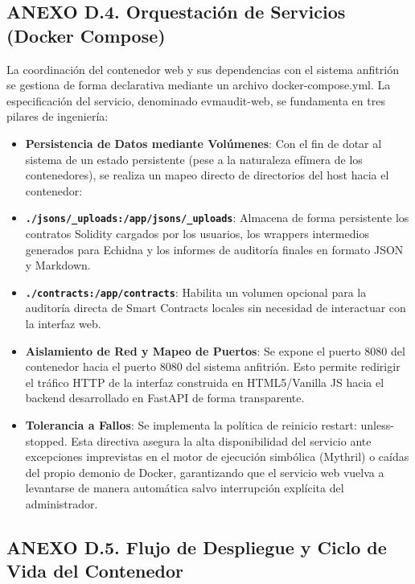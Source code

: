 \subsection{ANEXO D.4. Orquestación de Servicios (Docker
Compose)}\label{anexo-d.4.-orquestaciuxf3n-de-servicios-docker-compose}

La coordinación del contenedor web y sus dependencias con el sistema
anfitrión se gestiona de forma declarativa mediante un archivo
docker-compose.yml. La especificación del servicio, denominado
evmaudit-web, se fundamenta en tres pilares de ingeniería:

\begin{itemize}
\tightlist
\item
  \textbf{Persistencia de Datos mediante Volúmenes}: Con el fin de dotar
  al sistema de un estado persistente (pese a la naturaleza efímera de
  los contenedores), se realiza un mapeo directo de directorios del host
  hacia el contenedor:
\item
  \textbf{\texttt{./jsons/\_uploads:/app/jsons/\_uploads}}: Almacena de
  forma persistente los contratos Solidity cargados por los usuarios,
  los wrappers intermedios generados para Echidna y los informes de
  auditoría finales en formato JSON y Markdown.
\item
  \textbf{\texttt{./contracts:/app/contracts}}: Habilita un volumen
  opcional para la auditoría directa de Smart Contracts locales sin
  necesidad de interactuar con la interfaz web.
\item
  \textbf{Aislamiento de Red y Mapeo de Puertos}: Se expone el puerto
  8080 del contenedor hacia el puerto 8080 del sistema anfitrión. Esto
  permite redirigir el tráfico HTTP de la interfaz construida en
  HTML5/Vanilla JS hacia el backend desarrollado en FastAPI de forma
  transparente.
\item
  \textbf{Tolerancia a Fallos}: Se implementa la política de reinicio
  restart: unless-stopped. Esta directiva asegura la alta disponibilidad
  del servicio ante excepciones imprevistas en el motor de ejecución
  simbólica (Mythril) o caídas del propio demonio de Docker,
  garantizando que el servicio web vuelva a levantarse de manera
  automática salvo interrupción explícita del administrador.
\end{itemize}

\subsection{ANEXO D.5. Flujo de Despliegue y Ciclo de Vida del
Contenedor}\label{anexo-d.5.-flujo-de-despliegue-y-ciclo-de-vida-del-contenedor}

